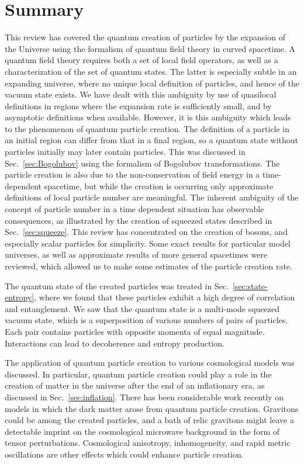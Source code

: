\documentclass[eqsecnum,floats,aps,prd,floatfix,titlepage,tightenlines]{revtex4}
\begin{document}
\section{Summary}
\label{sec:final}

This review has covered  the quantum creation of particles by the  expansion of the Universe using the formalism of quantum field theory in curved
spacetime. A quantum field theory requires both a set of local field operators, as well as a characterization of the set of quantum states. The latter
is especially subtle in an expanding universe, where no unique local definition of particles, and hence of the vacuum state exists. We have dealt with 
this ambiguity by use of quasilocal definitions in regions where the expansion rate is sufficiently small, and by asymptotic definitions when
available. However, it is this ambiguity which leads to the phenomenon of quantum particle creation. The definition of a particle in an initial region
can differ from that in a final region, so a quantum state without particles initially may later contain particles. This was discussed in Sec.~\ref{sec:Bogolubov}
using the formalism of Bogolubov transformations. The particle creation is also due to the non-conservation of field energy in a time-dependent
spacetime, but while the creation is occurring only approximate definitions of local particle number are meaningful. The inherent ambiguity of the
concept of particle number in a time dependent situation has observable consequences, as illustrated by the creation of squeezed states described
in Sec.~\ref{sec:squeeze}.
This review has concentrated on the creation of bosons, and especially scalar particles for
simplicity. Some exact results for particular model universes, as well as approximate results of more general spacetimes were reviewed, which 
allowed us to make some estimates of the particle creation rate. 

The quantum state of the created particles was treated in Sec.~\ref{sec:state-entropy}, where we found that these particles exhibit a high degree
of correlation and entanglement. We saw that the quantum state is a multi-mode squeezed vacuum state, which is a superposition of various numbers of
pairs of particles. Each pair contains particles with opposite momenta of equal magnitude. Interactions can lead to decoherence and entropy production.

The application of quantum particle creation to various cosmological models was discussed. In particular, quantum particle creation could play a role in the 
creation of matter in the universe after the end of an inflationary era, as discussed in Sec.~\ref{sec:inflation}.  There has been considerable work recently 
on models in which the dark matter arose from quantum particle creation.  Gravitons could be among the created particles, and a bath of relic gravitons
might leave a detectable imprint on the cosmological microwave background in the form of tensor perturbations. Cosmological anisotropy, inhomogeneity,
and rapid metric oscillations are other effects which could enhance particle creation.
\end{document}
